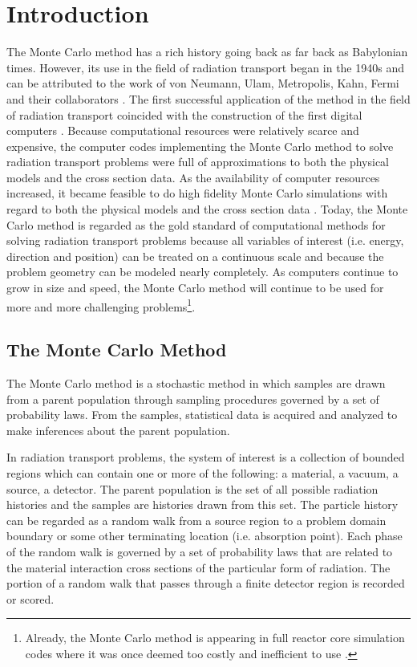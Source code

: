 \chapter{Introduction}
\label{ch:introduction}
The Monte Carlo method has a rich history going back as far back as Babylonian 
times. However, its use in the field of radiation transport began in the 1940s 
and can be attributed to the work of von Neumann, Ulam, Metropolis, Kahn, Fermi 
and their collaborators \citep{halton_retrospective_1970}. The first successful 
application of the method in the field of radiation transport coincided with 
the construction of the first digital computers \citep{lux_monte_1991}. Because 
computational resources were relatively scarce and expensive, the computer codes
implementing the Monte Carlo method to solve radiation transport problems were
full of approximations to both the physical models and the cross section data.
As the availability of computer resources increased, it became feasible to do 
high fidelity Monte Carlo simulations with regard to both the physical models 
and the cross section data \citep{chucas_preparing_1994}. Today, the Monte 
Carlo method is regarded as the gold standard of computational methods for 
solving radiation transport problems because all variables of interest 
(i.e. energy, direction and position) can be treated on a continuous scale and 
because the problem geometry can be modeled nearly completely. As computers 
continue to grow in size and speed, the Monte Carlo method will continue to be 
used for more and more challenging problems\footnote{Already, the Monte Carlo 
method is appearing in full reactor core simulation codes where it was once 
deemed too costly and inefficient to use \citep{hoogenboom_monte_2011}.}.

\section{The Monte Carlo Method}
\label{sec:monte_carlo_method}
The Monte Carlo method is a stochastic method in which samples are drawn from 
a parent population through sampling procedures governed by a set of 
probability laws. From the samples, statistical data is acquired and analyzed 
to make inferences about the parent population. 

In radiation transport problems, the system of interest is a collection of 
bounded regions which can contain one or more of the following: a material, a 
vacuum, a source, a detector. The parent population is the set of all possible 
radiation histories and the samples are histories drawn from this set. The 
particle history can be regarded as a random walk from a source region to a 
problem domain boundary or some other terminating location (i.e. absorption 
point). Each phase of the random walk is governed by a set of probability laws 
that are related to the material interaction cross sections of the particular 
form of radiation. The portion of a random walk that passes through a finite 
detector region is recorded or scored. 

